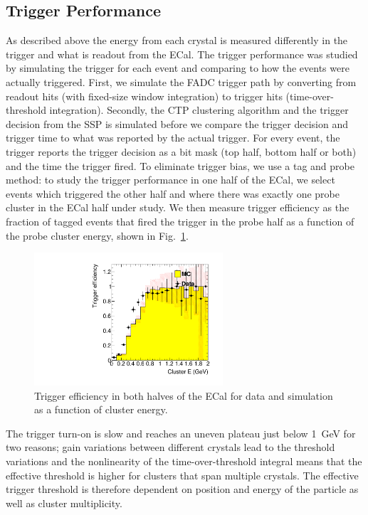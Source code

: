 \documentclass[final,3p,times,twocolumn]{elsarticle}
\begin{document}
\subsection{Trigger Performance}
As described above the energy from each 
crystal is measured differently in the trigger and what is readout from the ECal. 
The trigger performance was studied by simulating the 
trigger for each event and comparing to how the events were actually triggered.
First, we simulate the FADC trigger path by converting from readout hits (with fixed-size window 
integration) to trigger hits (time-over-threshold integration). Secondly, the CTP clustering 
algorithm and the trigger decision from the SSP is simulated before we compare the trigger decision 
and trigger time to what was reported by the actual trigger. For every event, the trigger reports the trigger 
decision as a bit mask (top half, bottom half or both) and the time the trigger fired. To eliminate trigger 
bias, we use a tag and probe method: to study the trigger performance in one half of the ECal, we select 
events which triggered the other half and where there was exactly one probe cluster in the ECal half 
under study. We then measure trigger efficiency as the fraction of tagged events that fired the trigger in 
the probe half as a function of the probe cluster energy, shown in Fig.~\ref{fig:turnon}. 
\begin{figure}[ht]
\begin{center}
{\small
	\includegraphics[width=7cm]{figures/h_cl_E_probedata_eff_h_cl_E_probeMC_eff_dataMC_1351-v7-trig-tagBot.pdf}
	\caption{Trigger efficiency in both halves of the ECal for data and simulation as a 
	function of cluster energy.}
\label{fig:turnon}
}
\end{center}
\end{figure}
The trigger turn-on is slow and reaches an uneven plateau just below 1~GeV for two reasons;  
gain variations between different crystals lead to the threshold variations and the nonlinearity of 
the time-over-threshold integral means that the effective threshold is higher for clusters that span 
multiple crystals. The effective trigger threshold is therefore dependent on position and energy of 
the particle as well as cluster multiplicity. 
\end{document}
